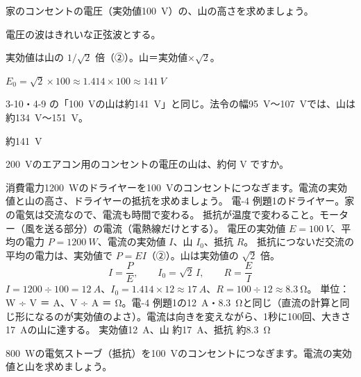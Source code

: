 \begin{reidai}
\label{ph:電-10:ex1}家のコンセントの電圧（実効値\qty{100}{V}）の、山の高さを求めましょう。
\par{} 電圧の波はきれいな正弦波とする。
\par\kangaekata 実効値は山の $1/\sqrt2$ 倍（②）。山＝実効値×$\sqrt2$。
\par\shiki $E_0=\sqrt2\times100\approx1.414\times100\approx\qty{141}{V}$
\par{} 3-10・4-9 の「\qty{100}{V}の山は約\qty{141}{V}」と同じ。法令の幅\qty{95}{V}〜\qty{107}{V}では、山は約\qty{134}{V}〜\qty{151}{V}。
\par\kotae 約\qty{141}{V}
\end{reidai}
\begin{jibun}
\qty{200}{V}のエアコン用のコンセントの電圧の山は、約何 V ですか。
\end{jibun}

\begin{phreidai}[ドライヤーの電流の実効値と山]
\label{ph:電-10:ex2}消費電力\qty{1200}{W}のドライヤーを\qty{100}{V}のコンセントにつなぎます。電流の実効値と山の高さ、ドライヤーの抵抗を求めましょう。
\phbamen
電-4 例題1のドライヤー。家の電気は交流なので、電流も時間で変わる。
\phmushi
抵抗が温度で変わること。モーター（風を送る部分）の電流（電熱線だけとする）。
\phzu
電圧の実効値 $E=\qty{100}{V}$、平均の電力 $P=\qty{1200}{W}$、電流の実効値 $I$、山 $I_0$、抵抗 $R$。
\phriyu
抵抗につないだ交流の平均の電力は、実効値で $P=EI$（②）。山は実効値の $\sqrt2$ 倍。
\phtateru
\[ I=\frac{P}{E},\qquad I_0=\sqrt2\,I,\qquad R=\frac{E}{I} \]
\phtoku
$I=1200\div100=\qty{12}{A}$、$I_0=1.414\times12\approx\qty{17}{A}$、$R=100\div12\approx\qty{8.3}{\ohm}$。
\phtashikame
単位：W ÷ V ＝ A、V ÷ A ＝ Ω。電-4 例題1の\qty{12}{A}・\qty{8.3}{\ohm}と同じ（直流の計算と同じ形になるのが実効値のよさ）。電流は向きを変えながら、1秒に100回、大きさ\qty{17}{A}の山に達する。
\kotae 実効値\qty{12}{A}、山 約\qty{17}{A}、抵抗 約\qty{8.3}{\ohm}
\end{phreidai}
\begin{jibun}
\qty{800}{W}の電気ストーブ（抵抗）を\qty{100}{V}のコンセントにつなぎます。電流の実効値と山を求めましょう。
\end{jibun}

